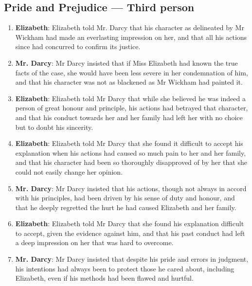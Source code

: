 \documentclass[10pt]{article}
\begin{document}
\subsection*{Pride and Prejudice --- Third person}

\begin{enumerate}\setlength{\itemsep}{1pt}\small

\item \textbf{Elizabeth}: Elizabeth told Mr. Darcy that his character as delineated by Mr Wickham had made an everlasting impression on her, and that all his actions since had concurred to confirm its justice.

\item \textbf{Mr. Darcy}: Mr Darcy insisted that if Miss Elizabeth had known the true facts of the case, she would have been less severe in her condemnation of him, and that his character was not as blackened as Mr Wickham had painted it.

\item \textbf{Elizabeth}: Elizabeth told Mr Darcy that while she believed he was indeed a person of great honour and principle, his actions had betrayed that character, and that his conduct towards her and her family had left her with no choice but to doubt his sincerity.

\item \textbf{Elizabeth}: Elizabeth told Mr Darcy that she found it difficult to accept his explanation when his actions had caused so much pain to her and her family, and that his character had been so thoroughly disapproved of by her that she could not easily change her opinion.

\item \textbf{Mr. Darcy}: Mr Darcy insisted that his actions, though not always in accord with his principles, had been driven by his sense of duty and honour, and that he deeply regretted the hurt he had caused Elizabeth and her family.

\item \textbf{Elizabeth}: Elizabeth told Mr Darcy that she found his explanation difficult to accept, given the evidence against him, and that his past conduct had left a deep impression on her that was hard to overcome.

\item \textbf{Mr. Darcy}: Mr Darcy insisted that despite his pride and errors in judgment, his intentions had always been to protect those he cared about, including Elizabeth, even if his methods had been flawed and hurtful.


\end{enumerate}
\end{document}
